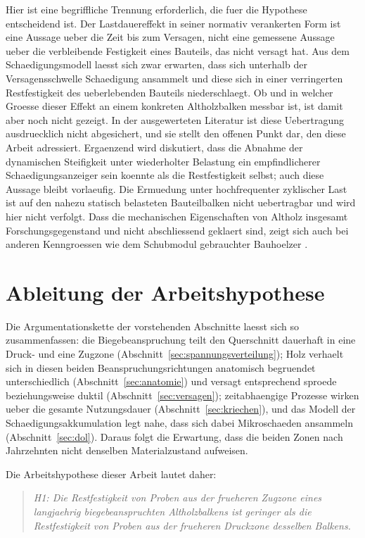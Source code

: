 Hier ist eine begriffliche Trennung erforderlich, die fuer die Hypothese
entscheidend ist. Der Lastdauereffekt in seiner normativ verankerten Form ist
eine Aussage ueber die Zeit bis zum Versagen, nicht eine gemessene Aussage
ueber die verbleibende Festigkeit eines Bauteils, das nicht versagt hat. Aus dem
Schaedigungsmodell laesst sich zwar erwarten, dass sich unterhalb der
Versagensschwelle Schaedigung ansammelt und diese sich in einer verringerten
Restfestigkeit des ueberlebenden Bauteils niederschlaegt. Ob und in welcher
Groesse dieser Effekt an einem konkreten Altholzbalken messbar ist, ist damit
aber noch nicht gezeigt. In der ausgewerteten Literatur ist diese Uebertragung
ausdruecklich nicht abgesichert, und sie stellt den offenen Punkt dar, den diese
Arbeit adressiert. Ergaenzend wird diskutiert, dass die Abnahme der dynamischen
Steifigkeit unter wiederholter Belastung ein empfindlicherer Schaedigungsanzeiger
sein koennte als die Restfestigkeit selbst; auch diese Aussage bleibt vorlaeufig.
Die Ermuedung unter hochfrequenter zyklischer Last ist auf den nahezu statisch
belasteten Bauteilbalken nicht uebertragbar und wird hier nicht verfolgt. Dass
die mechanischen Eigenschaften von Altholz insgesamt Forschungsgegenstand und
nicht abschliessend geklaert sind, zeigt sich auch bei anderen Kenngroessen wie
dem Schubmodul gebrauchter Bauhoelzer \parencite{iforest}.

\section{Ableitung der Arbeitshypothese}
\label{sec:hypothese}

Die Argumentationskette der vorstehenden Abschnitte laesst sich so
zusammenfassen: die Biegebeanspruchung teilt den Querschnitt dauerhaft in eine
Druck- und eine Zugzone (Abschnitt~\ref{sec:spannungsverteilung}); Holz verhaelt
sich in diesen beiden Beanspruchungsrichtungen anatomisch begruendet
unterschiedlich (Abschnitt~\ref{sec:anatomie}) und versagt entsprechend sproede
beziehungsweise duktil (Abschnitt~\ref{sec:versagen}); zeitabhaengige Prozesse
wirken ueber die gesamte Nutzungsdauer (Abschnitt~\ref{sec:kriechen}), und das
Modell der Schaedigungsakkumulation legt nahe, dass sich dabei Mikroschaeden
ansammeln (Abschnitt~\ref{sec:dol}). Daraus folgt die Erwartung, dass die beiden
Zonen nach Jahrzehnten nicht denselben Materialzustand aufweisen.

Die Arbeitshypothese dieser Arbeit lautet daher:

\begin{quote}
\textit{H1: Die Restfestigkeit von Proben aus der frueheren Zugzone eines
langjaehrig biegebeanspruchten Altholzbalkens ist geringer als die
Restfestigkeit von Proben aus der frueheren Druckzone desselben Balkens.}
\end{quote}

